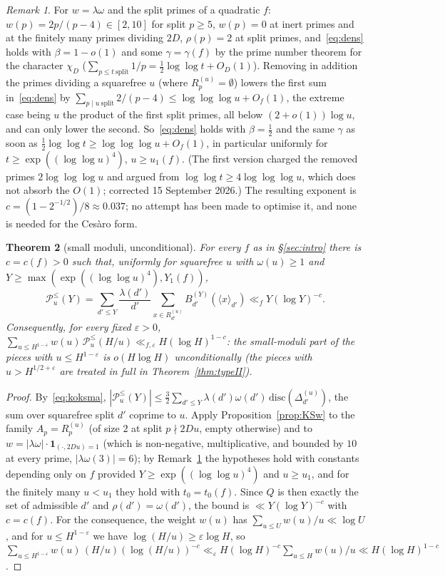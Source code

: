 \documentclass[11pt,a4paper]{article}
\newtheorem{theorem}{Theorem}
\theoremstyle{remark}\newtheorem{remark}[theorem]{Remark}
\newcommand{\rep}[2]{\langle #1\rangle_{#2}}
\begin{document}
\begin{remark}\label{rem:KSwconst}
For $w=\lambda\omega$ and the split primes of a quadratic $f$: $w(p)=2p/(p-4)\in[2,10]$ for split $p\ge5$, $w(p)=0$ at inert
primes and at the finitely many primes dividing $2D$, $\rho(p)=2$ at split primes, and~\eqref{eq:dens} holds with
$\beta=1-o(1)$ and some $\gamma=\gamma(f)$ by the prime number theorem for the character $\chi_D$
($\sum_{p\le t\ \mathrm{split}}1/p=\tfrac12\log\log t+O_D(1)$). Removing in addition the primes dividing a squarefree $u$
(where $R^{(u)}_p=\emptyset$) lowers the first sum in~\eqref{eq:dens} by
$\sum_{p\mid u\ \mathrm{split}}2/(p-4)\le\log\log\log u+O_f(1)$, the extreme case being $u$ the product of the first split
primes, all below $(2+o(1))\log u$, and can only lower the second. So~\eqref{eq:dens} holds with $\beta=\tfrac12$ and the same
$\gamma$ as soon as $\tfrac12\log\log t\ge\log\log\log u+O_f(1)$, in particular uniformly for $t\ge\exp((\log\log u)^4)$,
$u\ge u_1(f)$. (The first version charged the removed primes $2\log\log\log u$ and argued from
$\log\log t\ge4\log\log\log u$, which does not absorb the $O(1)$; corrected 15 September 2026.) The resulting exponent is $c=(1-2^{-1/2})/8\approx0.037$; no attempt has been made to
optimise it, and none is needed for the Ces\`aro form.
\end{remark}

\begin{theorem}[small moduli, unconditional]\label{thm:small}
For every $f$ as in \S\ref{sec:intro} there is $c=c(f)>0$ such that, uniformly for squarefree $u$ with $\omega(u)\ge1$
and $Y\ge\max(\exp((\log\log u)^4),Y_1(f))$,
\[
\mathcal P^{\le}_u(Y)=\sum_{d'\le Y}\frac{\lambda(d')}{d'}\sum_{x\in R^{(u)}_{d'}}B^{(Y)}_{d'}(\rep x{d'})\ll_fY(\log Y)^{-c}.
\]
Consequently, for every fixed $\varepsilon>0$, $\sum_{u\le H^{1-\varepsilon}}w(u)\,\mathcal P^{\le}_u(H/u)\ll_{f,\varepsilon}H(\log H)^{1-c}$: the
small-moduli part of the pieces with $u\le H^{1-\varepsilon}$ is $o(H\log H)$ unconditionally (the pieces with
$u>H^{1/2+\varepsilon}$ are treated in full in Theorem~\ref{thm:typeII}).
\end{theorem}
\begin{proof}
By~\eqref{eq:koksma}, $|\mathcal P^\le_u(Y)|\le\tfrac32\sum_{d'\le Y}\lambda(d')\omega(d')\,\mathrm{disc}(\Delta^{(u)}_{d'})$, the sum over
squarefree split $d'$ coprime to $u$. Apply Proposition~\ref{prop:KSw} to the family $A_p=R^{(u)}_p$ (of size $2$ at
split $p\nmid 2Du$, empty otherwise) and to $w=|\lambda\omega|\cdot\mathbf 1_{(\cdot,2Du)=1}$ (which is non-negative, multiplicative,
and bounded by $10$ at every prime, $|\lambda\omega(3)|=6$); by Remark~\ref{rem:KSwconst} the
hypotheses hold with constants depending only on $f$ provided $Y\ge\exp((\log\log u)^4)$ and $u\ge u_1$, and for the
finitely many $u<u_1$ they hold with $t_0=t_0(f)$. Since $Q$ is then exactly the set of admissible $d'$ and
$\rho(d')=\omega(d')$, the bound is $\ll Y(\log Y)^{-c}$ with $c=c(f)$. For the consequence, the weight
$w(u)$ has $\sum_{u\le U}w(u)/u\ll\log U$, and for $u\le H^{1-\varepsilon}$ we have $\log(H/u)\ge\varepsilon\log H$, so
$\sum_{u\le H^{1-\varepsilon}}w(u)\,(H/u)(\log(H/u))^{-c}\ll_\varepsilon H(\log H)^{-c}\sum_{u\le H}w(u)/u\ll H(\log H)^{1-c}$.
\end{proof}
\end{document}
